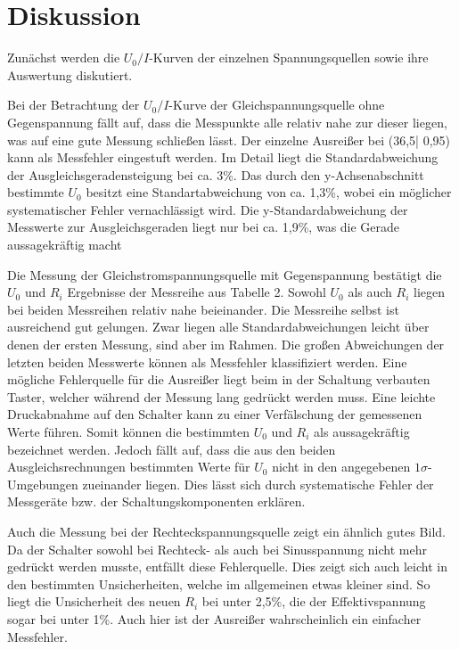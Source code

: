 \section{Diskussion}
\label{sec:Diskussion}


Zunächst werden die $U_0/I $-Kurven der einzelnen Spannungsquellen sowie ihre Auswertung diskutiert.

Bei der Betrachtung der $U_0 /I$-Kurve der Gleichspannungsquelle ohne Gegenspannung
fällt auf, dass die Messpunkte alle relativ nahe zur dieser liegen, was auf eine gute
Messung schließen lässt. Der einzelne Ausreißer bei (36,5| 0,95) kann als Messfehler
eingestuft werden.
 Im Detail liegt die Standardabweichung der Ausgleichsgeradensteigung bei ca. 3\%. Das durch den
 y-Achsenabschnitt bestimmte $U_0$ besitzt eine Standartabweichung von ca. 1,3\%, wobei ein möglicher
 systematischer Fehler vernachlässigt wird.
 Die y-Standardabweichung der Messwerte zur Ausgleichsgeraden liegt nur bei ca. 1,9\%,
  was die Gerade aussagekräftig macht


Die Messung der Gleichstromspannungsquelle mit Gegenspannung bestätigt die $U_0$ und $R_i$ Ergebnisse
der Messreihe aus Tabelle 2. Sowohl $U_0$ als auch $R_i$ liegen bei beiden Messreihen
 relativ nahe beieinander.  Die Messreihe selbst ist ausreichend gut gelungen.
 Zwar liegen alle Standardabweichungen leicht über denen der ersten Messung,
 sind aber im Rahmen.
 Die großen Abweichungen der letzten beiden Messwerte können als Messfehler klassifiziert werden.
 Eine mögliche Fehlerquelle für die Ausreißer liegt beim in der Schaltung verbauten Taster,
  welcher während der Messung lang gedrückt werden muss. Eine leichte Druckabnahme auf den Schalter
  kann zu einer Verfälschung der gemessenen Werte führen.
 Somit können die bestimmten $U_0$ und $R_i$ als aussagekräftig bezeichnet werden.
 Jedoch fällt auf, dass die aus den beiden Ausgleichsrechnungen bestimmten Werte für $U_0$
 nicht in den angegebenen $1\sigma$-Umgebungen zueinander liegen.
 Dies lässt sich durch systematische Fehler der Messgeräte bzw. der Schaltungskomponenten erklären.


Auch die Messung bei der Rechteckspannungsquelle zeigt ein ähnlich gutes Bild.
 Da  der Schalter sowohl bei Rechteck- als auch bei Sinusspannung nicht mehr gedrückt werden musste,
entfällt diese Fehlerquelle. Dies zeigt sich auch leicht in den bestimmten Unsicherheiten,
welche im allgemeinen etwas kleiner sind. So liegt die Unsicherheit des neuen $R_i$ bei
unter 2,5\%, die der Effektivspannung sogar bei unter 1\%. Auch hier ist der Ausreißer wahrscheinlich
ein einfacher Messfehler.

